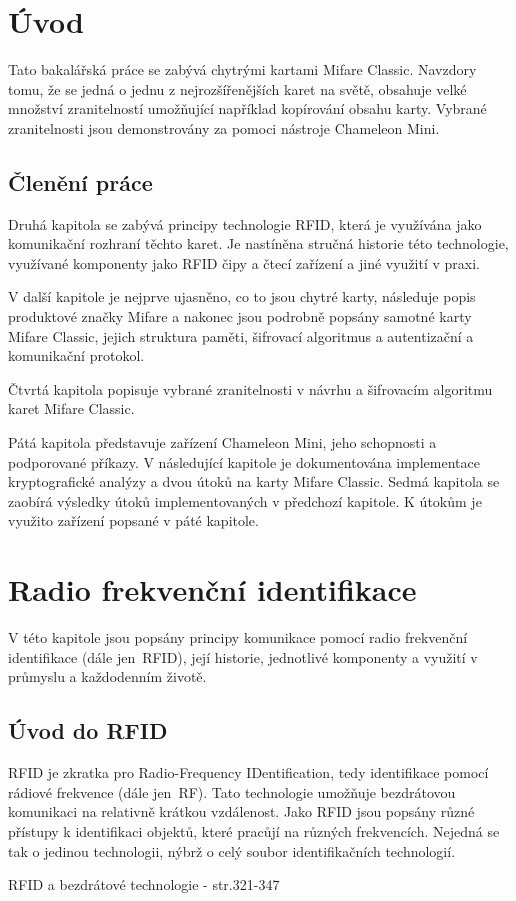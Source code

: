 \chapter{Úvod}
\label{uvod}
Tato bakalářská práce se zabývá chytrými kartami Mifare Classic. Navzdory tomu, že se jedná o jednu z nejrozšířenějších karet na světě, obsahuje velké množství zranitelností umožňující například kopírování obsahu karty. Vybrané zranitelnosti jsou demonstrovány za pomoci nástroje Chameleon Mini.\par
\section*{Členění práce}
Druhá kapitola se zabývá principy technologie RFID, která je využívána jako komunikační rozhraní těchto karet. Je nastíněna stručná historie této technologie, využívané komponenty jako RFID čipy a čtecí zařízení a jiné využití v praxi.\par
V další kapitole je nejprve ujasněno, co to jsou chytré karty, následuje popis produktové značky Mifare a nakonec jsou podrobně popsány samotné karty Mifare Classic, jejich struktura paměti, šifrovací algoritmus a autentizační a komunikační protokol.\par
Čtvrtá kapitola popisuje vybrané zranitelnosti v návrhu a šifrovacím algoritmu karet Mifare Classic.\par
Pátá kapitola představuje zařízení Chameleon Mini, jeho schopnosti a podporované příkazy. 
V následující kapitole je dokumentována implementace kryptografické analýzy a dvou útoků na karty Mifare Classic.
Sedmá kapitola se zaobírá výsledky útoků implementovaných v předchozí kapitole. K útokům je využito zařízení popsané v páté kapitole.

\chapter{Radio frekvenční identifikace}
\label{technologie_rfid}
V této kapitole jsou popsány principy komunikace pomocí radio frekvenční identifikace (dále jen~RFID), její historie, jednotlivé komponenty a využití v průmyslu a každodenním životě.

\section{Úvod do RFID}
RFID je zkratka pro {Radio-Frequency IDentification}, tedy identifikace pomocí rádiové frekvence (dále jen~RF). Tato technologie umožňuje bezdrátovou komunikaci na relativně krátkou vzdálenost\cite{The_RF_in_RFID}. Jako RFID jsou popsány různé přístupy k identifikaci objektů, které pracůjí na různých frekvencích. Nejedná se tak o jedinou technologii, nýbrž o celý soubor identifikačních technologií.
\par
RFID a bezdrátové technologie \cite{Smart_Cards_Tokens_Security}{ - str.321-347}

